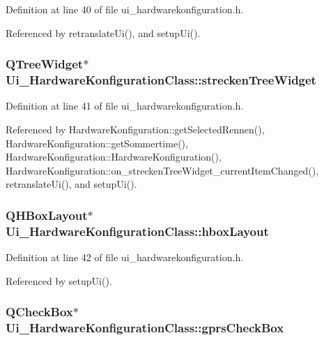 Definition at line 40 of file ui\_\-hardwarekonfiguration.h.

Referenced by retranslateUi(), and setupUi().\hypertarget{class_ui___hardware_konfiguration_class_1548d7d5be705d18b1427a98d7f773ee}{
\subsubsection[streckenTreeWidget]{\setlength{\rightskip}{0pt plus 5cm}QTreeWidget$\ast$ {\bf Ui\_\-HardwareKonfigurationClass::streckenTreeWidget}}}
\label{class_ui___hardware_konfiguration_class_1548d7d5be705d18b1427a98d7f773ee}




Definition at line 41 of file ui\_\-hardwarekonfiguration.h.

Referenced by HardwareKonfiguration::getSelectedRennen(), HardwareKonfiguration::getSommertime(), HardwareKonfiguration::HardwareKonfiguration(), HardwareKonfiguration::on\_\-streckenTreeWidget\_\-currentItemChanged(), retranslateUi(), and setupUi().\hypertarget{class_ui___hardware_konfiguration_class_370d044e4d30bbce7980dd52733764ab}{
\subsubsection[hboxLayout]{\setlength{\rightskip}{0pt plus 5cm}QHBoxLayout$\ast$ {\bf Ui\_\-HardwareKonfigurationClass::hboxLayout}}}
\label{class_ui___hardware_konfiguration_class_370d044e4d30bbce7980dd52733764ab}




Definition at line 42 of file ui\_\-hardwarekonfiguration.h.

Referenced by setupUi().\hypertarget{class_ui___hardware_konfiguration_class_4324c232d41bd325d7acfa566e5f466a}{
\subsubsection[gprsCheckBox]{\setlength{\rightskip}{0pt plus 5cm}QCheckBox$\ast$ {\bf Ui\_\-HardwareKonfigurationClass::gprsCheckBox}}}
\label{class_ui___hardware_konfiguration_class_4324c232d41bd325d7acfa566e5f466a}




